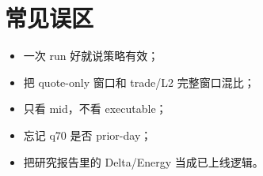 \section{常见误区}

\begin{itemize}[leftmargin=2em]
  \item 一次 run 好就说策略有效；
  \item 把 quote-only 窗口和 trade/L2 完整窗口混比；
  \item 只看 mid，不看 executable；
  \item 忘记 q70 是否 prior-day；
  \item 把研究报告里的 Delta/Energy 当成已上线逻辑。
\end{itemize}


